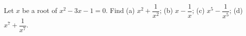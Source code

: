 Let $x$ be a root of $x^2-3x-1=0$. Find (a) $x^2+\dfrac1{x^2}$; (b) $x-\dfrac1x$; (c) $x^5-\dfrac1{x^5}$; (d) $x^7+\dfrac1{x^7}$.
